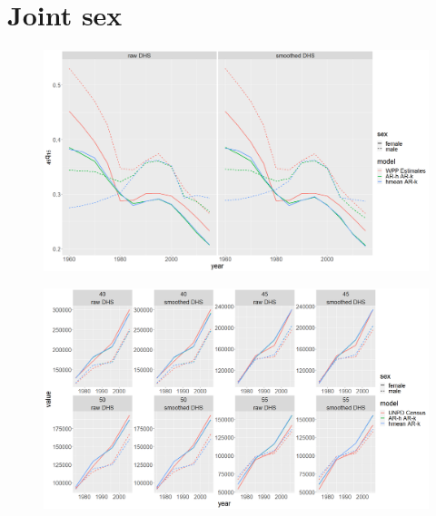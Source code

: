 \documentclass[12pt,a4paper]{article}
\begin{document}
\section*{\centering Joint sex}
\begin{figure}[H]
\includegraphics[width = \linewidth]{Burkina Faso/7/joint q4515.png}
\end{figure}
\begin{figure}[H]
\includegraphics[width = \linewidth]{Burkina Faso/7/joint age pop.png}
\end{figure}
\end{document}
